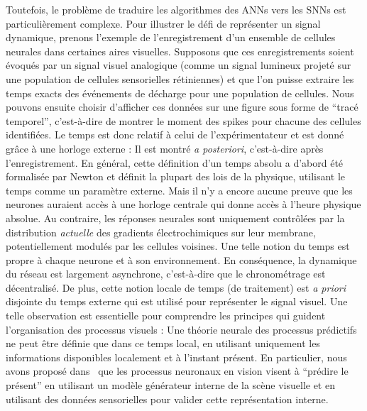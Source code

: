 \documentclass[10pt,french,a4paper]{article}%
\begin{document}
Toutefois, le problème de traduire les algorithmes des ANNs vers les SNNs est particulièrement complexe. Pour illustrer le défi de représenter un signal dynamique, prenons l'exemple de l'enregistrement d'un ensemble de cellules neurales dans certaines aires visuelles. Supposons que ces enregistrements soient évoqués par un signal visuel analogique (comme un signal lumineux projeté sur une population de cellules sensorielles rétiniennes) et que l'on puisse extraire les temps exacts des événements de décharge pour une population de cellules. Nous pouvons ensuite choisir d'afficher ces données sur une figure sous forme de ``tracé temporel'', c'est-à-dire de montrer le moment des spikes pour chacune des cellules identifiées. Le temps est donc relatif à celui de l'expérimentateur et est donné grâce à une horloge externe : Il est montré \emph{a posteriori}, c'est-à-dire après l'enregistrement. En général, cette définition d'un temps absolu a d'abord été formalisée par Newton et définit la plupart des lois de la physique, utilisant le temps comme un paramètre externe. Mais il n'y a encore aucune preuve que les neurones auraient accès à une horloge centrale qui donne accès à l'heure physique absolue. Au contraire, les réponses neurales sont uniquement contrôlées par la distribution \emph{actuelle} des gradients électrochimiques sur leur membrane, potentiellement modulés par les cellules voisines. Une telle notion du temps est propre à chaque neurone et à son environnement. En conséquence, la dynamique du réseau est largement asynchrone, c'est-à-dire que le \og chronométrage\fg{} est décentralisé. De plus, cette notion locale de temps (de traitement) est \emph{a priori} disjointe du temps externe qui est utilisé pour représenter le signal visuel. Une telle observation est essentielle pour comprendre les principes qui guident l'organisation des processus visuels : Une théorie neurale des processus prédictifs ne peut être définie que dans ce temps local, en utilisant uniquement les informations disponibles localement et à l'instant présent. En particulier, nous avons proposé dans~\citep{PerrinetAdamsFriston14} que les processus neuronaux en vision visent à ``prédire le présent'' en utilisant un modèle générateur interne de la scène visuelle et en utilisant des données sensorielles pour valider cette représentation interne.
\end{document}

